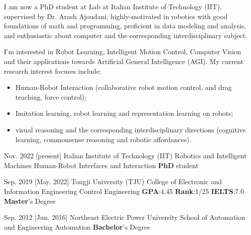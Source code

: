 \documentclass{resume}
\begin{document}
\makeheader

I am now a PhD student at  Lab at Italian Institute of Technology (IIT), supervised by Dr.  {Arash Ajoudani}, highly-motivated in robotics with good foundations of math and programming, proficient in data modeling and analysis, and enthusiastic about computer and the corresponding interdisciplinary subject.

I'm interested in Robot Learning, Intelligent Motion Control, Computer Vision and their applications towards Artificial General Intelligence (AGI). My current research interest focuses include:
\begin{itemize}
  \item Human-Robot Interaction (collaborative robot motion control, and drag teaching, force control);
  \item Imitation learning, robot learning and representation learning on robots;
  \item visual reasoning and the corresponding interdisciplinary directions (cognitive learning, commonsense reasoning and robotic affordances).\\
\end{itemize}

\begin{educations}

  \education%
  {Nov. 2022}%
  [present]%
  {Italian Institute of Technology (IIT)}%
  {Robotics and Intelligent Machines}%
  {Human-Robot Interfaces and Interaction}%
  {\textbf{PhD} student}\\

  \separator{0.7ex}

  \education%
    {Sep. 2019}%
    [May. 2022]%
    {Tongji University (TJU)}%
    {College of Electronic and Information Engineering}%
    {Control Engineering \quad \textbf{GPA}:4.45 \quad \textbf{Rank}:1/25 \quad \textbf{IELTS}:7.0}%
    {\textbf{Master}'s Degree}\\

  \separator{0.7ex}

  \education%
    {Sep. 2012}%
    [Jun. 2016]%
    {Northeast Electric Power University}%
    {School of Automation and Engineering}%
    {Automation}%
    {\textbf{Bachelor}'s Degree}
    
\end{educations}
\end{document}
